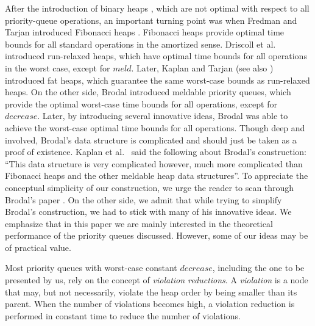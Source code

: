 \documentclass{llncs}
\newcommand{\Decrease}{\mbox{$\mathit{decrease}$}}
\newcommand{\Meld}{\mbox{$\mathit{meld}$}}
\begin{document}
After the introduction of binary heaps \cite{Wil64}, which are not
optimal with respect to all priority-queue operations, an important
turning point was when Fredman and Tarjan introduced Fibonacci heaps
\cite{FT87}. Fibonacci heaps provide optimal time bounds for all
standard operations in the amortized sense.  Driscoll et
al.~\cite{DGST88} introduced run-relaxed heaps, which have optimal
time bounds for all operations in the worst case, except for
\Meld{}. Later, Kaplan and Tarjan \cite{KT99} (see also \cite{KST02})
introduced fat heaps, which guarantee the same worst-case bounds as
run-relaxed heaps.  On the other side, Brodal \cite{Bro95} introduced
meldable priority queues, which provide the optimal worst-case time
bounds for all operations, except for \Decrease{}. Later, by
introducing several innovative ideas, Brodal \cite{Bro96} was able to
achieve the worst-case optimal time bounds for all operations.  Though
deep and involved, Brodal's data structure is complicated and should
just be taken as a proof of existence.
Kaplan et al.~\cite{KST02} said the following about Brodal's construction: 
``This data structure is very complicated however, much more complicated 
than Fibonacci heaps and the other meldable heap data structures''.  
To appreciate the conceptual simplicity of our construction, we urge the 
reader to scan through Brodal's paper \cite{Bro96}.  On the other side, 
we admit that while trying to simplify Brodal's construction, we had to 
stick with many of his innovative ideas.
We emphasize that in this paper we are mainly interested in the
theoretical performance of the priority queues discussed.  However,
some of our ideas may be of practical value.

Most priority queues with worst-case constant \Decrease{}, including
the one to be presented by us, rely on the concept of \emph{violation
  reductions}.  A \emph{violation} is a node that may, but not necessarily, violate the heap
order by being smaller than its parent.  When the number of violations
becomes high, a violation reduction is performed in constant time to
reduce the number of violations.
\end{document}
